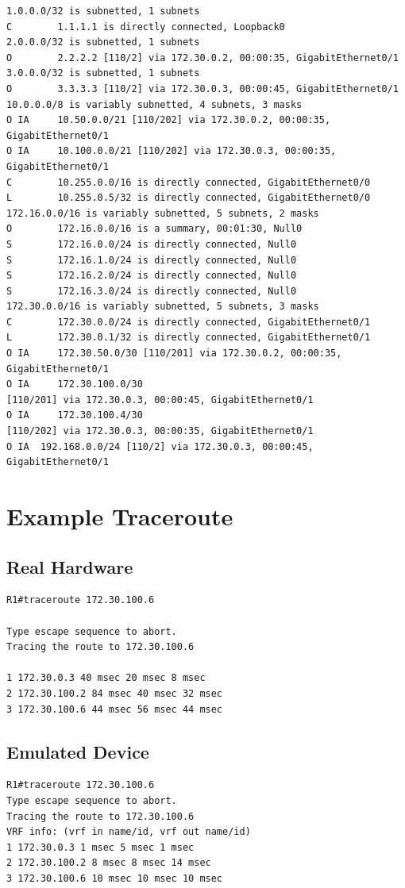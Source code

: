 \documentclass[11pt]{report}
\begin{document}
\begin{appendices}
\begin{lstlisting}
1.0.0.0/32 is subnetted, 1 subnets
C        1.1.1.1 is directly connected, Loopback0
2.0.0.0/32 is subnetted, 1 subnets
O        2.2.2.2 [110/2] via 172.30.0.2, 00:00:35, GigabitEthernet0/1
3.0.0.0/32 is subnetted, 1 subnets
O        3.3.3.3 [110/2] via 172.30.0.3, 00:00:45, GigabitEthernet0/1
10.0.0.0/8 is variably subnetted, 4 subnets, 3 masks
O IA     10.50.0.0/21 [110/202] via 172.30.0.2, 00:00:35, GigabitEthernet0/1
O IA     10.100.0.0/21 [110/202] via 172.30.0.3, 00:00:35, GigabitEthernet0/1
C        10.255.0.0/16 is directly connected, GigabitEthernet0/0
L        10.255.0.5/32 is directly connected, GigabitEthernet0/0
172.16.0.0/16 is variably subnetted, 5 subnets, 2 masks
O        172.16.0.0/16 is a summary, 00:01:30, Null0
S        172.16.0.0/24 is directly connected, Null0
S        172.16.1.0/24 is directly connected, Null0
S        172.16.2.0/24 is directly connected, Null0
S        172.16.3.0/24 is directly connected, Null0
172.30.0.0/16 is variably subnetted, 5 subnets, 3 masks
C        172.30.0.0/24 is directly connected, GigabitEthernet0/1
L        172.30.0.1/32 is directly connected, GigabitEthernet0/1
O IA     172.30.50.0/30 [110/201] via 172.30.0.2, 00:00:35, GigabitEthernet0/1
O IA     172.30.100.0/30
[110/201] via 172.30.0.3, 00:00:45, GigabitEthernet0/1
O IA     172.30.100.4/30
[110/202] via 172.30.0.3, 00:00:35, GigabitEthernet0/1
O IA  192.168.0.0/24 [110/2] via 172.30.0.3, 00:00:45, GigabitEthernet0/1
\end{lstlisting}

\section{Example Traceroute}

\subsection{Real Hardware}
\begin{lstlisting}
R1#traceroute 172.30.100.6

Type escape sequence to abort.
Tracing the route to 172.30.100.6

1 172.30.0.3 40 msec 20 msec 8 msec
2 172.30.100.2 84 msec 40 msec 32 msec
3 172.30.100.6 44 msec 56 msec 44 msec
\end{lstlisting}

\subsection{Emulated Device}
\begin{lstlisting}
R1#traceroute 172.30.100.6
Type escape sequence to abort.
Tracing the route to 172.30.100.6
VRF info: (vrf in name/id, vrf out name/id)
1 172.30.0.3 1 msec 5 msec 1 msec
2 172.30.100.2 8 msec 8 msec 14 msec
3 172.30.100.6 10 msec 10 msec 10 msec
\end{lstlisting}


\end{appendices}
\end{document}
